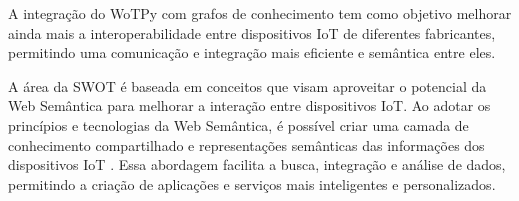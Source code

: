 A integração do WoTPy com grafos de conhecimento tem como objetivo melhorar ainda mais a interoperabilidade entre dispositivos IoT de diferentes fabricantes, permitindo uma comunicação e integração mais eficiente e semântica entre eles.

A área da SWOT \cite{Scioscia2009} \cite{Jara2014SWoT} é baseada em conceitos que visam aproveitar o potencial da Web Semântica para melhorar a interação entre dispositivos IoT. Ao adotar os princípios e tecnologias da Web Semântica, é possível criar uma camada de conhecimento compartilhado e representações semânticas das informações dos dispositivos IoT \cite{bernerslee2001semantic}. Essa abordagem facilita a busca, integração e análise de dados, permitindo a criação de aplicações e serviços mais inteligentes e personalizados.

